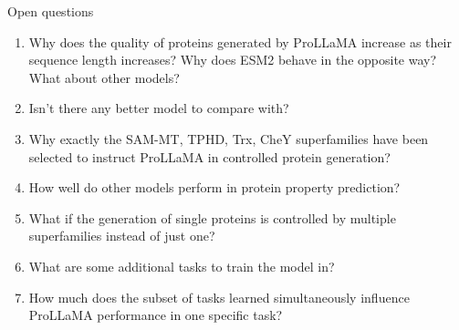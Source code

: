 \begin{frame}{Open questions}
	\begin{enumerate}\setlength\itemsep{1em}
		\item Why does the quality of proteins generated by ProLLaMA increase as their sequence length increases? Why does ESM2 behave in the opposite way? What about other models?
		\item Isn't there any better model to compare with?
		\item Why exactly the SAM-MT, TPHD, Trx, CheY superfamilies have been selected to instruct ProLLaMA in controlled protein generation?
		\item How well do other models perform in protein property prediction?
		\item What if the generation of single proteins is controlled by multiple superfamilies instead of just one?
		\item What are some additional tasks to train the model in?
		\item How much does the subset of tasks learned simultaneously influence ProLLaMA performance in one specific task?
	\end{enumerate}
\end{frame}